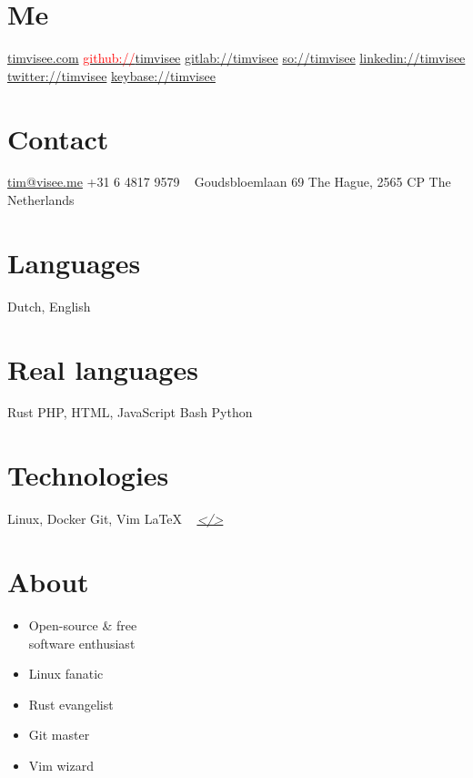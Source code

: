 \documentclass[]{friggeri-cv}
\providecommand{\tightlist}{%
\setlength{\itemsep}{0pt}\setlength{\parskip}{0pt}}
\begin{document}


\begin{aside}
\section{Me}
\href{https://timvisee.com/}{timvisee.com}
\href{https://github.com/timvisee}{\textcolor{red}{github://}timvisee}
\href{https://gitlab.com/timvisee}{gitlab://timvisee}
\href{https://stackoverflow.com/users/1000145}{so://timvisee}
\href{https://linkedin.com/in/timvisee}{linkedin://timvisee}
\href{https://twitter.com/timvisee}{twitter://timvisee}
\href{https://keybase.io/timvisee}{keybase://timvisee}
\section{Contact}
\href{mailto:tim@visee.me}{tim@visee.me}
+31 6 4817 9579
~
Goudsbloemlaan 69
The Hague, 2565 CP
The Netherlands
\section{Languages}
Dutch, English
\section{Real languages}
Rust
PHP, HTML, JavaScript
Bash
Python
\section{Technologies}
Linux, Docker
Git, Vim
\LaTeX{}
~
\textit{\href{https://github.com/timvisee/cv}{</>}}
\end{aside}


\section{About}
\begin{multicols}{2}
\begin{itemize}
  \tightlist{}
  \item Open-source \& free \\software enthusiast
  \item Linux fanatic
  \item Rust evangelist
  \item Git master
  \item Vim wizard
\end{itemize}
\end{multicols}
\end{document}
